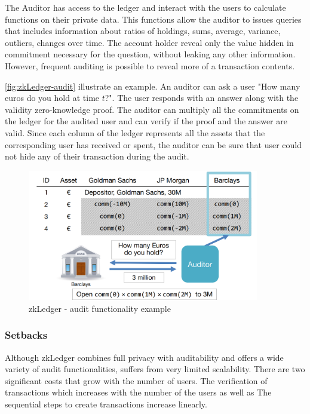 The Auditor has access to the ledger and interact with the users to calculate functions on their private data. This functions allow the auditor to issues queries that includes information about ratios of holdings, sums, average, variance, outliers, changes over time. The account holder reveal only the value hidden in commitment necessary for the question, without leaking any other information. However, frequent auditing is possible to reveal more of a transaction contents.

\autoref{fig:zkLedger-audit} illustrate an example. An auditor can ask a user "How many euros do you hold at time $t$?". The user responds with an answer along with the validity zero-knowledge proof. The auditor can multiply all the commitments on the ledger for the audited user and can verify if the proof and the answer are valid. Since each column of the ledger represents all the assets that the corresponding user has received or spent, the auditor can be sure that user could not hide any of their transaction during the audit.

\begin{figure}
    \centering
    \includegraphics[width=0.9\textwidth]{images/zkLedger/zkledger-audit.png}
    \caption{zkLedger - audit functionality example}
    \label{fig:zkLedger-audit}
\end{figure}

\subsubsection{Setbacks}
Although zkLedger combines full privacy with auditability and offers a wide variety of audit functionalities, suffers from very limited scalability. There are two significant costs that grow with the number of users. The verification of transactions which increases with the number of the users as well as The sequential steps to create transactions increase linearly. 

